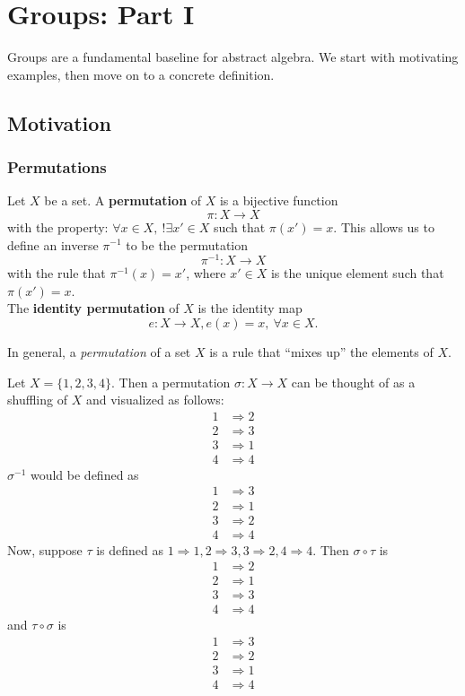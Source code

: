 \documentclass[math1530-lecture-notes]{subfiles}
\begin{document}
\chapter{Groups: Part I}

Groups are a fundamental baseline for abstract algebra. We start with motivating examples, then move
on to a concrete definition.

\section{Motivation}
\subsection{Permutations}

\begin{definition}[Permutations]{}
  Let $X$ be a set. A \textbf{permutation} of $X$ is a bijective function \[\pi: X \to X\] with the
    property: $\forall x\in X,\ !\exists x'\in X$ such that $\pi(x')=x$. This allows us to define an
    inverse $\pi^{-1}$ to be the permutation \[
    \pi^{-1}:X\to X
  \] with the rule that $\pi^{-1}(x)=x'$, where $x'\in X$ is the unique element such that
  $\pi(x')=x$. \\
  The \textbf{identity permutation} of $X$ is the identity map \[
    e:X\to X, e(x)=x,\ \forall x\in X
  .\] 
\end{definition}
In general, a \textit{permutation} of a set $X$ is a rule that ``mixes up'' the elements of $X$.

\begin{example}
  Let $X =\{1, 2, 3, 4 \} $. Then a permutation $\sigma: X \to X$ can be thought of as a shuffling of $X$ and
  visualized as follows:
  \begin{align*}
    1 &\Rightarrow 2 \\
    2 &\Rightarrow 3 \\
    3 &\Rightarrow 1 \\
    4 &\Rightarrow 4
  \end{align*}
  $\sigma^{-1}$ would be defined as
  \begin{align*}
    1 &\Rightarrow 3\\
    2 &\Rightarrow 1\\
    3 &\Rightarrow 2 \\
    4 &\Rightarrow 4 
  \end{align*}
  Now, suppose $\tau$ is defined as $1\Rightarrow 1, 2\Rightarrow 3, 3\Rightarrow 2, 4\Rightarrow
  4$. Then $\sigma\circ \tau$ is
  \begin{align*}
    1 &\Rightarrow 2 \\
    2 &\Rightarrow 1 \\
    3 &\Rightarrow 3 \\
    4 &\Rightarrow 4
  \end{align*}
  and $\tau\circ \sigma$ is 
  \begin{align*}
    1 &\Rightarrow 3 \\
    2 &\Rightarrow 2 \\
    3 &\Rightarrow 1 \\
    4 &\Rightarrow 4 
  \end{align*}
\end{example}
\end{document}
